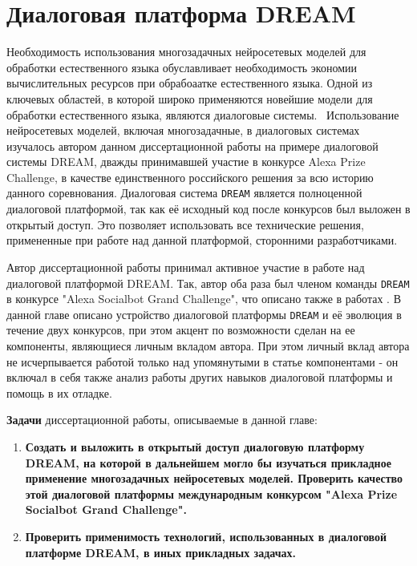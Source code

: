 \chapter{Диалоговая платформа DREAM}\label{ch:dream} 

Необходимость использования многозадачных нейросетевых моделей для обработки естественного языка обуславливает необходимость экономии вычислительных ресурсов при обрабоаатке естественного языка. Одной из ключевых областей, в которой широко применяются новейшие модели для обработки естественного языка, являются диалоговые системы.  Использование нейросетевых моделей, включая многозадачные, в диалоговых системах изучалось автором данном диссертационной работы на примере диалоговой системы DREAM, дважды принимавшей участие в конкурсе Alexa Prize Challenge, в качестве единственного российского решения за всю историю данного соревнования. Диалоговая система \texttt{DREAM} является полноценной диалоговой платформой, так как её исходный код после конкурсов был выложен в открытый доступ. Это позволяет использовать все технические решения, примененные при работе над данной платформой, сторонними разработчиками.

Автор диссертационной работы принимал активное участие в работе над диалоговой платформой DREAM. Так, автор оба раза был членом команды \texttt{DREAM} в конкурсе "Alexa Socialbot Grand Challenge", что описано также в работах \cite{dream1,dream1_trudy,dream2}. В данной главе описано устройство диалоговой платформы \texttt{DREAM} и её эволюция в течение двух конкурсов, при этом акцент по возможности сделан на ее компоненты, являющиеся личным вкладом автора. При этом личный вклад автора не исчерпывается работой только над упомянутыми в статье компонентами - он включал в себя также анализ работы других навыков диалоговой платформы и помощь в их отладке.

\textbf{Задачи} диссертационной работы, описываемые в данной главе:
\begin{enumerate}
  \item \textbf{Создать и выложить в открытый доступ диалоговую платформу DREAM, на которой в дальнейшем могло бы изучаться прикладное применение многозадачных нейросетевых моделей. Проверить качество этой диалоговой платформы международным конкурсом "Alexa Prize Socialbot Grand Challenge". }
  \item \textbf{Проверить применимость технологий, использованных в диалоговой платформе DREAM, в иных прикладных задачах.}
\end{enumerate}

